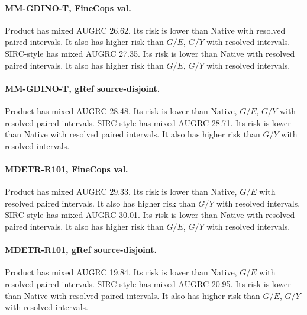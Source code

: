 \paragraph{MM-GDINO-T, FineCops val.} Product has mixed AUGRC 26.62. Its risk is lower than Native with resolved paired intervals. It also has higher risk than $G/E$, $G/Y$ with resolved intervals.  SIRC-style has mixed AUGRC 27.35. Its risk is lower than Native with resolved paired intervals. It also has higher risk than $G/E$, $G/Y$ with resolved intervals. 

\paragraph{MM-GDINO-T, gRef source-disjoint.} Product has mixed AUGRC 28.48. Its risk is lower than Native, $G/E$, $G/Y$ with resolved paired intervals.  SIRC-style has mixed AUGRC 28.71. Its risk is lower than Native with resolved paired intervals. It also has higher risk than $G/Y$ with resolved intervals. 

\paragraph{MDETR-R101, FineCops val.} Product has mixed AUGRC 29.33. Its risk is lower than Native, $G/E$ with resolved paired intervals. It also has higher risk than $G/Y$ with resolved intervals.  SIRC-style has mixed AUGRC 30.01. Its risk is lower than Native with resolved paired intervals. It also has higher risk than $G/E$, $G/Y$ with resolved intervals. 

\paragraph{MDETR-R101, gRef source-disjoint.} Product has mixed AUGRC 19.84. Its risk is lower than Native, $G/E$ with resolved paired intervals.  SIRC-style has mixed AUGRC 20.95. Its risk is lower than Native with resolved paired intervals. It also has higher risk than $G/E$, $G/Y$ with resolved intervals. 
